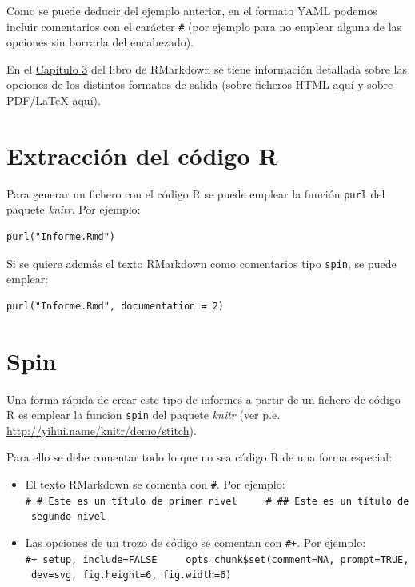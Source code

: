\documentclass[
]{book}
\providecommand{\tightlist}{%
  \setlength{\itemsep}{0pt}\setlength{\parskip}{0pt}}
\theoremstyle{definition}
\theoremstyle{definition}
\theoremstyle{definition}
\theoremstyle{definition}
\theoremstyle{remark}
\begin{document}
Como se puede deducir del ejemplo anterior, en el formato YAML podemos incluir comentarios con el carácter \texttt{\#}
(por ejemplo para no emplear alguna de las opciones sin borrarla del encabezado).

En el \href{https://bookdown.org/yihui/rmarkdown/documents.html}{Capítulo 3} del libro de RMarkdown
se tiene información detallada sobre las opciones de los distintos formatos de salida
(sobre ficheros HTML \href{https://bookdown.org/yihui/rmarkdown/html-document.html}{aquí}
y sobre PDF/LaTeX \href{https://bookdown.org/yihui/rmarkdown/pdf-document.html}{aquí}).

\hypertarget{extracciuxf3n-del-cuxf3digo-r}{%
\section{Extracción del código R}\label{extracciuxf3n-del-cuxf3digo-r}}

Para generar un fichero con el código R se puede emplear la función \texttt{purl} del paquete \emph{knitr}. Por ejemplo:

\begin{verbatim}
purl("Informe.Rmd")
\end{verbatim}

Si se quiere además el texto RMarkdown como comentarios tipo \texttt{spin}, se puede emplear:

\begin{verbatim}
purl("Informe.Rmd", documentation = 2)
\end{verbatim}

\hypertarget{spin}{%
\section{Spin}\label{spin}}

Una forma rápida de crear este tipo de informes a partir de un fichero de código R es emplear la funcion
\texttt{spin} del paquete \emph{knitr} (ver p.e. \url{http://yihui.name/knitr/demo/stitch}).

Para ello se debe comentar todo lo que no sea código R de una forma especial:

\begin{itemize}
\tightlist
\item
  El texto RMarkdown se comenta con \texttt{\#\textquotesingle{}}. Por ejemplo:
  \texttt{\#\textquotesingle{}\ \#\ Este\ es\ un\ título\ de\ primer\ nivel\ \ \ \ \ \#\textquotesingle{}\ \#\#\ Este\ es\ un\ título\ de\ segundo\ nivel}
\item
  Las opciones de un trozo de código se comentan con \texttt{\#+}. Por ejemplo:
  \texttt{\#+\ setup,\ include=FALSE\ \ \ \ \ opts\_chunk\$set(comment=NA,\ prompt=TRUE,\ dev=\textquotesingle{}svg\textquotesingle{},\ fig.height=6,\ fig.width=6)}
\end{itemize}
\end{document}
